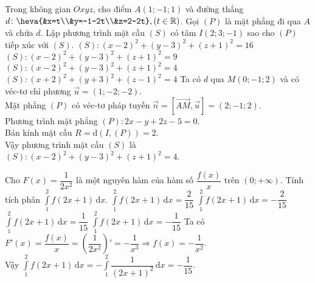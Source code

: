 \begin{ex}%
Trong không gian $Oxyz$, cho điểm $A(1;-1;1)$ và đường thẳng $d \colon \heva{&x=t\\&y=-1-2t\\&z=2-2t}, (t\in \mathbb{R})$. Gọi
$(P)$ là mặt phẳng đi qua $A$ và chứa $d$. Lập phương trình mặt cầu $(S)$ có tâm $I(2; 3;-1)$ sao cho $(P)$ tiếp xúc với $(S)$.
\choice
{$(S)\colon(x-2)^2+(y-3)^2+(z+1)^2=16$}
{$(S)\colon(x-2)^2+(y-3)^2+(z+1)^2=9$}
{\True $(S)\colon(x-2)^2+(y-3)^2+(z+1)^2=4$}
{$(S)\colon(x+2)^2+(y+3)^2+(z-1)^2=4$}
\loigiai
{Ta có 
$d$ qua $M(0;- 1; 2)$ và có véc-tơ chỉ phương $\overrightarrow{u}=(1; - 2; - 2)$.\\
Mặt phẳng $(P)$ có véc-tơ pháp tuyến $\overrightarrow{n}=[\overrightarrow{AM},\overrightarrow{u}]=(2;- 1; 2)$.\\
Phương trình mặt phẳng $(P)\colon 2 x - y +2 z -5 = 0$.\\
Bán kính mặt cầu $R= \mathrm{d}(I,(P)) =2$.\\
Vậy phương trình mặt cầu $(S)$ là $(S)\colon(x-2)^2+(y-3)^2+(z+1)^2=4$.
}
\end{ex}

\begin{ex}%
Cho $F(x)=\dfrac{1}{2x^2}$ là một nguyên hàm của hàm số $\dfrac{f(x)}{x}$ trên $(0;+\infty)$. Tính tích phân $\displaystyle\int\limits_1^2f(2x+1)\mathrm{\,d}x.$
\choice
{$\displaystyle\int\limits_1^2f(2x+1)\mathrm{\,d}x=\dfrac{2}{15}$}
{$\displaystyle\int\limits_1^2f(2x+1)\mathrm{\,d}x=-\dfrac{2}{15}$}
{$\displaystyle\int\limits_1^2f(2x+1)\mathrm{\,d}x=\dfrac{1}{15}$}
{\True $\displaystyle\int\limits_1^2f(2x+1)\mathrm{\,d}x=-\dfrac{1}{15}$}
\loigiai
{Ta có $F'(x)=\dfrac{f(x)}{x}=\left(\dfrac{1}{2x^2}\right)'=-\dfrac{1}{x^3}\Rightarrow f(x)=-\dfrac{1}{x^2}$.\\
Vậy $\displaystyle\int\limits_1^2f(2x+1)\mathrm{\,d}x=-\displaystyle\int\limits_1^2\dfrac{1}{(2x+1)^2}\mathrm{\,d}x=-\dfrac{1}{15}.$
}
\end{ex}

